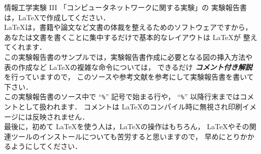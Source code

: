 \documentclass[a4j]{jreport}
\begin{document}
%
情報工学実験 III 「コンピュータネットワークに関する実験」の
実験報告書は，\LaTeX で作成してください．\\
%
%
%

\LaTeX は，書籍や論文など文書の体裁を整えるためのソフトウェアですから，
あなたは文書を書くことに集中するだけで基本的なレイアウトは \LaTeX が
整えてくれます．\\

この実験報告書のサンプルでは，実験報告書作成に必要となる図の挿入方法や
表の作成など \LaTeX の複雑な命令については，
できるだけ \textbf{\emph{コメント付き解説}} を行っていますので，
このソースや参考文献\cite{LaTeX2e}を参考にして実験報告書を書いて下さい．\\

この実験報告書のソース中で ``\texttt{\%}'' 記号で始まる行や，
``\texttt{\%}'' 以降行末まではコメントとして扱われます．
%
コメントは \LaTeX のコンパイル時に無視され印刷イメージには反映されません．\\

最後に，初めて \LaTeX を使う人は，\LaTeX の操作はもちろん，
\LaTeX やその関連ツールのインストールについても苦労すると思いますので，
早めにとりかかるようにしてください．
\end{document}
